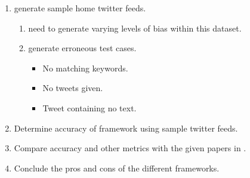 \documentclass[a4paper,fleqn,10pt]{article}
\begin{document}
\begin{enumerate}
    \item generate sample home twitter feeds.
    \begin{enumerate}
        \item need to generate varying levels of bias within this dataset.
        \item generate erroneous test cases.
        \begin{itemize}
            \item No matching keywords.
            \item No tweets given.
            \item Tweet containing no text.
        \end{itemize}
    \end{enumerate}
    \item Determine accuracy of framework using sample twitter feeds.
    \item Compare accuracy and other metrics with the given papers in .
    \item Conclude the pros and cons of the different frameworks.
\end{enumerate}
\end{document}
